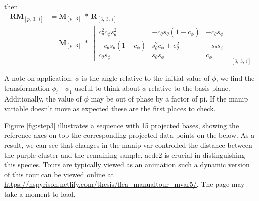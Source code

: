 then \begin{align*}
  \textbf{RM}_{[p,~3,~i]}
  &= \textbf{M}_{[p,~3]} ~*~ \textbf{R}_{[3,~3,~i]} \\
  &= \textbf{M}_{[p,~3]}
    ~*~
  \begin{bmatrix}
    c_\theta^2 c_\phi s_\theta^2 &
    -c_\theta s_\theta (1 - c_\phi) &
    -c_\theta s_\phi \\
    -c_\theta s_\theta (1 - c_\phi) &
    s_\theta^2 c_\phi + c_\theta^2 &
    -s_\theta s_\phi \\
    c_\theta s_\phi &
    s_\theta s_\phi &
    c_\phi
  \end{bmatrix}_{[3,~3,~i]}
\end{align*}

A note on application: \(\phi\) is the angle relative to the initial
value of \(\phi\), we find the transformation \(\phi_i\) - \(\phi_1\)
useful to think about \(\phi\) relative to the basis plane.
Additionally, the value of \(\phi\) may be out of phase by a factor of
pi. If the manip variable doesn't move as expected these are the first
places to check.

Figure \ref{fig:step3} illustrates a sequence with 15 projected bases,
showing the reference axes on top the corresponding projected data
points on the below. As a result, we can see that changes in the manip
var controlled the distance between the purple cluster and the remaining
sample, aede2 is crucial in distinguishing this species. Tours are
typically viewed as an animation such a dynamic version of this tour can
be viewed online at
\url{https://nspyrison.netlify.com/thesis/flea_manualtour_mvar5/}. The
page may take a moment to load.

